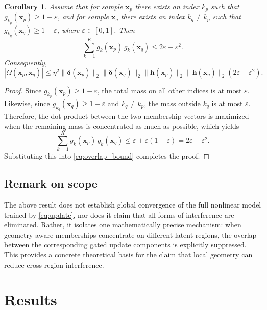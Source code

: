 \documentclass{article}
\newtheorem{cor}[thm]{Corollary}
\theoremstyle{definition}
\theoremstyle{remark}
\begin{document}
\begin{cor}
Assume that for sample $\mathbf{x}_p$ there exists an index $k_p$ such that $g_{k_p}(\mathbf{x}_p)\ge 1-\varepsilon$, and for sample $\mathbf{x}_q$ there exists an index $k_q\neq k_p$ such that $g_{k_q}(\mathbf{x}_q)\ge 1-\varepsilon$, where $\varepsilon\in[0,1]$. Then
\begin{equation}
\sum_{k=1}^{K} g_k(\mathbf{x}_p)\,g_k(\mathbf{x}_q)
\le 2\varepsilon-\varepsilon^2.
\label{eq:eps_bound}
\end{equation}
Consequently,
\begin{equation}
|\Omega(\mathbf{x}_p,\mathbf{x}_q)|
\le
\eta^2
\|\boldsymbol{\delta}(\mathbf{x}_p)\|_2
\|\boldsymbol{\delta}(\mathbf{x}_q)\|_2
\|\mathbf{h}(\mathbf{x}_p)\|_2
\|\mathbf{h}(\mathbf{x}_q)\|_2
(2\varepsilon-\varepsilon^2).
\label{eq:eps_overlap_bound}
\end{equation}
\end{cor}

\begin{proof}
Since $g_{k_p}(\mathbf{x}_p)\ge 1-\varepsilon$, the total mass on all other indices is at most $\varepsilon$. Likewise, since $g_{k_q}(\mathbf{x}_q)\ge 1-\varepsilon$ and $k_q\neq k_p$, the mass outside $k_q$ is at most $\varepsilon$. Therefore, the dot product between the two membership vectors is maximized when the remaining mass is concentrated as much as possible, which yields
\[
\sum_{k=1}^{K} g_k(\mathbf{x}_p)\,g_k(\mathbf{x}_q)
\le \varepsilon + \varepsilon(1-\varepsilon)
=2\varepsilon-\varepsilon^2.
\]
Substituting this into \eqref{eq:overlap_bound} completes the proof.
\end{proof}

\subsection{Remark on scope}

The above result does not establish global convergence of the full nonlinear model trained by \eqref{eq:update}, nor does it claim that all forms of interference are eliminated. Rather, it isolates one mathematically precise mechanism: when geometry-aware memberships concentrate on different latent regions, the overlap between the corresponding gated update components is explicitly suppressed. This provides a concrete theoretical basis for the claim that local geometry can reduce cross-region interference.


\section{Results}
\label{sec:results}
\end{document}
